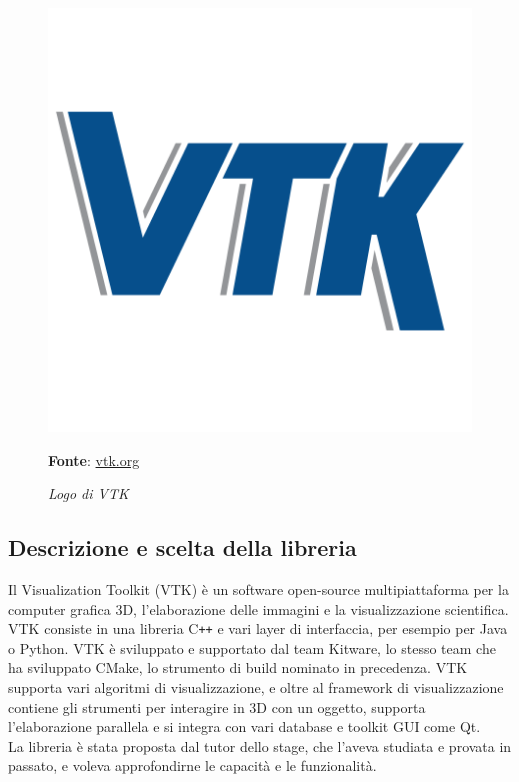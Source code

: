 \begin{figure}[h]
    \centering
    \includegraphics[scale=0.1]{immagini/volumerendering/VTK_logo.png}
    \caption{\textit{Logo di VTK}}
    \textbf{Fonte}: \href{https://vtk.org/}{vtk.org}
    \label{fig: Logo VTK}
\end{figure}

\subsection{Descrizione e scelta della libreria}\label{sec:scelta-liberia}
Il Visualization Toolkit (VTK) è un software open-source multipiattaforma per la computer grafica 3D, l'elaborazione delle immagini e la visualizzazione scientifica. VTK consiste in una libreria C\texttt{++} e vari layer di interfaccia, per esempio per Java o Python. VTK è sviluppato e supportato dal team Kitware, lo stesso team che ha sviluppato CMake, lo strumento di build nominato in precedenza. VTK supporta vari algoritmi di visualizzazione, e oltre al framework di visualizzazione contiene gli strumenti per interagire in 3D con un oggetto, supporta l'elaborazione parallela e si integra con vari database e toolkit GUI come Qt.\\
La libreria è stata proposta dal tutor dello stage, che l'aveva studiata e provata in passato, e voleva approfondirne le capacità e le funzionalità.

